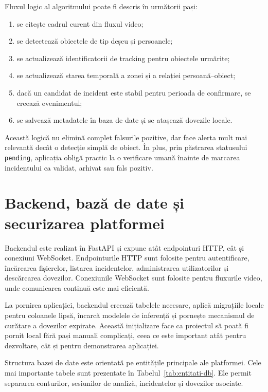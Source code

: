 Fluxul logic al algoritmului poate fi descris în următorii pași:

\begin{enumerate}
    \item se citește cadrul curent din fluxul video;
    \item se detectează obiectele de tip deșeu și persoanele;
    \item se actualizează identificatorii de tracking pentru obiectele urmărite;
    \item se actualizează starea temporală a zonei și a relației persoană--obiect;
    \item dacă un candidat de incident este stabil pentru perioada de confirmare, se creează evenimentul;
    \item se salvează metadatele în baza de date și se atașează dovezile locale.
\end{enumerate}

Această logică nu elimină complet falsurile pozitive, dar face alerta mult mai relevantă decât o detecție simplă de obiect. În plus, prin păstrarea statusului \texttt{pending}, aplicația obligă practic la o verificare umană înainte de marcarea incidentului ca validat, arhivat sau fals pozitiv.

\section{Backend, bază de date și securizarea platformei}

Backendul este realizat în FastAPI și expune atât endpointuri HTTP, cât și conexiuni WebSocket. Endpointurile HTTP sunt folosite pentru autentificare, încărcarea fișierelor, listarea incidentelor, administrarea utilizatorilor și descărcarea dovezilor. Conexiunile WebSocket sunt folosite pentru fluxurile video, unde comunicarea continuă este mai eficientă.

La pornirea aplicației, backendul creează tabelele necesare, aplică migrațiile locale pentru coloanele lipsă, încarcă modelele de inferență și pornește mecanismul de curățare a dovezilor expirate. Această inițializare face ca proiectul să poată fi pornit local fără pași manuali complicați, ceea ce este important atât pentru dezvoltare, cât și pentru demonstrarea aplicației.

Structura bazei de date este orientată pe entitățile principale ale platformei. Cele mai importante tabele sunt prezentate în Tabelul~\ref{tab:entitati-db}. Ele permit separarea conturilor, sesiunilor de analiză, incidentelor și dovezilor asociate.

